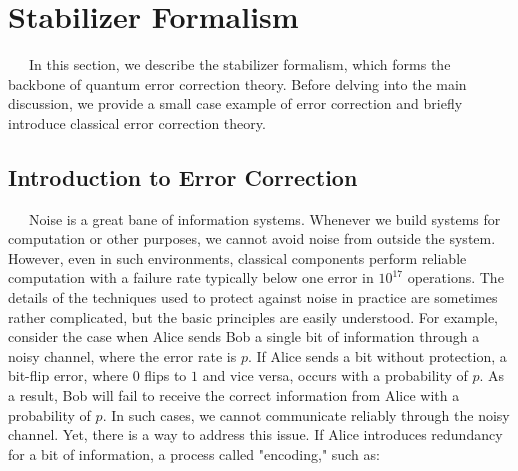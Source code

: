 \documentclass[a4paper,11pt]{ltjsarticle}
\begin{document}
\section{Stabilizer Formalism \cite{nielsen2010}}{
    \ \ \ In this section, we describe the stabilizer formalism, which forms the backbone of quantum error correction theory. Before delving into the main discussion, we provide a small case example of error correction and briefly introduce classical error correction theory.
    \subsection{Introduction to Error Correction}\label{introduction_to_error_correction}{
        \ \ \ Noise is a great bane of information systems. Whenever we build systems for computation or other purposes, we cannot avoid noise from outside the system. However, even in such environments, classical components perform reliable computation with a failure rate typically below one error in $10^{17}$ operations. The details of the techniques used to protect against noise in practice are sometimes rather complicated, but the basic principles are easily understood. For example, consider the case when Alice sends Bob a single bit of information through a noisy channel, where the error rate is $p$. If Alice sends a bit without protection, a bit-flip error, where $0$ flips to $1$ and vice versa, occurs with a probability of $p$. As a result, Bob will fail to receive the correct information from Alice with a probability of $p$. In such cases, we cannot communicate reliably through the noisy channel. Yet, there is a way to address this issue. If Alice introduces redundancy for a bit of information, a process called "encoding," such as:

}}
\end{document}
